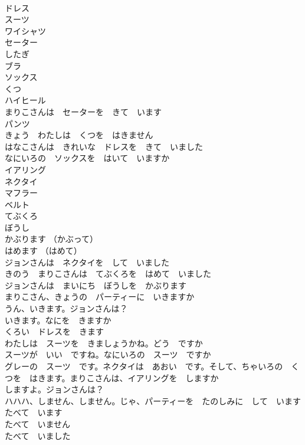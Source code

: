 \documentclass[8pt]{extreport}
\begin{document}
\begin{CJK}{UTF8}{min}
\\	ドレス	
\\	スーツ	
\\	ワイシャツ	
\\	セーター	
\\	したぎ	
\\	ブラ	
\\	ソックス	
\\	くつ	
\\	ハイヒール	
\\	まりこさんは　セーターを　きて　います	
\\	パンツ	
\\	きょう　わたしは　くつを　はきません	
\\	はなこさんは　きれいな　ドレスを　きて　いました	
\\	なにいろの　ソックスを　はいて　いますか	
\\	イアリング	
\\	ネクタイ	
\\	マフラー	
\\	ベルト	
\\	てぶくろ	
\\	ぼうし	
\\	かぶります （かぶって）	
\\	はめます （はめて）	
\\	ジョンさんは　ネクタイを　して　いました	
\\	きのう　まりこさんは　てぶくろを　はめて　いました	
\\	ジョンさんは　まいにち　ぼうしを　かぶります	
\\	まりこさん、きょうの　パーティーに　いきますか	
\\	うん、いきます。ジョンさんは？	
\\	いきます。なにを　きますか	
\\	くろい　ドレスを　きます	
\\	わたしは　スーツを　きましょうかね。どう　ですか	
\\	スーツが　いい　ですね。なにいろの　スーツ　ですか	
\\	グレーの　スーツ　です。ネクタイは　あおい　です。そして、ちゃいろの　くつを　はきます。まりこさんは、イアリングを　しますか	
\\	しますよ。ジョンさんは？	
\\	ハハハ、しません、しません。じゃ、パーティーを　たのしみに　して　います	
\\	たべて　います	
\\	たべて　いません	
\\	たべて　いました	

\end{CJK}
\end{document}

